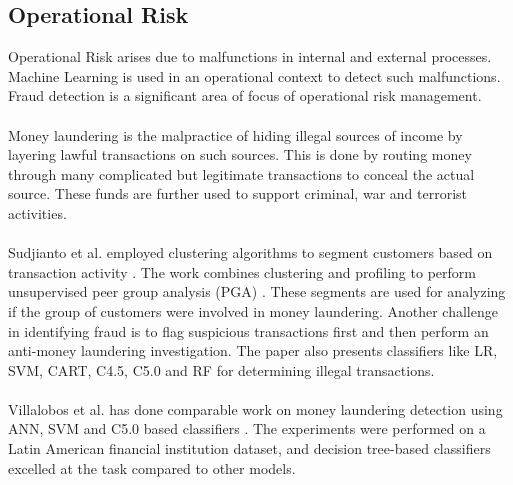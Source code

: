 \documentclass[a4paper, 12pt]{article}
\begin{document}
\vskip 0.2in
\subsection{Operational Risk}
\noindent Operational Risk arises due to malfunctions in internal and external processes. Machine Learning is used in an operational context to detect such malfunctions. Fraud detection is a significant area of focus of operational risk management.
\\
\\
\noindent Money laundering is the malpractice of hiding illegal sources of income by layering lawful transactions on such sources. This is done by routing money through many complicated but legitimate transactions to conceal the actual source. These funds are further used to support criminal, war and terrorist activities.
\\
\\
\noindent Sudjianto et al. employed clustering algorithms to segment customers based on transaction activity \cite{sudjianto2010statistical}. The work combines clustering and profiling to perform unsupervised peer group analysis (PGA) \cite{bolton2001peer}. These segments are used for analyzing if the group of customers were involved in money laundering. Another challenge in identifying fraud is to flag suspicious transactions first and then perform an anti-money laundering investigation. The paper also presents classifiers like LR, SVM, CART, C4.5, C5.0 and RF for determining illegal transactions.
\\
\\
\noindent Villalobos et al. has done comparable work on money laundering detection using ANN, SVM and C5.0 based classifiers \cite{villalobos2017statistical}. The experiments were performed on a Latin American financial institution dataset, and decision tree-based classifiers excelled at the task compared to other models. 
\end{document}
